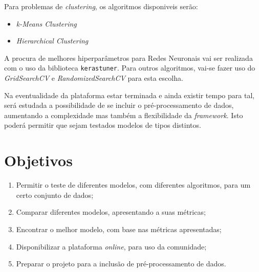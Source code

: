 \documentclass[a4paper]{article}
\begin{document}
{    Para problemas de \textit{clustering}, os algoritmos disponiveis serão:
    \begin{itemize}
        \item \textit{k-Means Clustering}
        \item \textit{Hierarchical Clustering}
    \end{itemize}
    
    A procura de melhores hiperparâmetros para Redes Neuronais vai ser realizada com o uso da biblioteca \texttt{kerastuner}. 
    Para outros algoritmos, vai-se fazer uso do \textit{GridSearchCV} e \textit{RandomizedSearchCV} para esta escolha.

    Na eventualidade da plataforma estar terminada e ainda existir tempo para tal, será estudada a possibilidade de se incluir o pré-processamento de dados, 
    aumentando a complexidade mas também a flexibilidade da \textit{framework}. Isto poderá permitir que sejam testados modelos de tipos distintos.
}

\section{Objetivos}
\normalsize{
    \begin{enumerate}
        \item Permitir o teste de diferentes modelos, com diferentes algoritmos, para um certo conjunto de dados;
        \item Comparar diferentes modelos, apresentando a suas métricas;
        \item Encontrar o melhor modelo, com base nas métricas apresentadas;
        \item Disponibilizar a plataforma \textit{online}, para uso da comunidade;
        \item Preparar o projeto para a inclusão de pré-processamento de dados.
    \end{enumerate}
}
\end{document}
